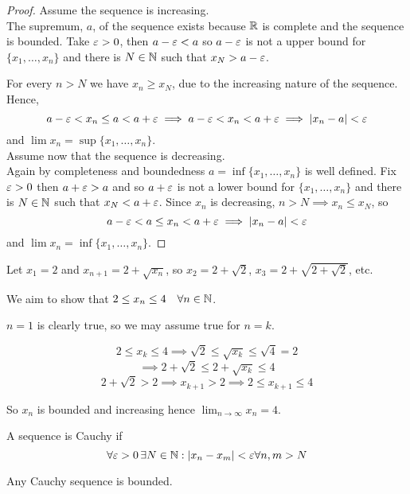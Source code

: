 \documentclass[a4paper,10pt]{article}
\begin{document}
\begin{proof}
	Assume the sequence is increasing.\\

	The supremum, $a$, of the sequence exists because $\mathbb{R}$ is
	complete and the sequence is bounded. Take $\varepsilon > 0$, then $a
	- \varepsilon < a$ so $a - \varepsilon$ is not a upper bound for $\{x_1,
	\ldots, x_n\}$ and there is $N \in \mathbb{N}$ such that $x_N > a - \varepsilon$.

	For every $n > N$ we have $x_n \geq x_N$, due to the increasing
	nature of the sequence. Hence,
	\[
		a - \varepsilon < x_n \leq a < a + \varepsilon
		\implies a - \varepsilon < x_n < a + \varepsilon
		\implies | x_n - a | < \varepsilon
	\]
	and $\lim x_n = \sup\{x_1, \ldots, x_n\}$.\\

	Assume now that the sequence is decreasing.\\

	Again by completeness and boundedness $a = \inf \{x_1, \ldots,
	x_n\}$ is well defined.
	Fix $\varepsilon > 0$ then $a + \varepsilon > a$ and so $a + \varepsilon$ is not a
	lower bound for $\{x_1, \ldots, x_n\}$ and there is $N \in \mathbb{N}$
	such that $x_N < a + \varepsilon$.
	Since $x_n$ is decreasing, $n > N \implies x_n \leq x_N$, so
	\[
		a - \varepsilon < a \leq x_n < a + \varepsilon
		\implies | x_n - a | < \varepsilon
	\]
	and $\lim x_n = \inf \{x_1, \ldots, x_n\}$.
\end{proof}

\begin{ex}
	Let $x_1 = 2$ and $x_{n+1} = 2 + \sqrt{x_n}$, so $x_2 = 2 +
	\sqrt{2}$, $x_3 = 2 + \sqrt{2 + \sqrt{2}}$, etc.

	We aim to show that $2 \leq x_n \leq 4 \quad \forall n \in \mathbb{N}$.

	$n=1$ is clearly true, so we may assume true for $n=k$.

	\[
		2 \leq x_k \leq 4 \implies \sqrt{2} \leq \sqrt{x_k} \leq \sqrt{4} = 2
	\]
	\[
		\implies 2 + \sqrt{2} \leq 2 + \sqrt{x_k} \leq 4
	\]
	\[
		2 + \sqrt{2} > 2 \implies x_{k+1} > 2 \implies 2 \leq x_{k+1} \leq 4
	\]

	So $x_n$ is bounded and increasing hence $\lim_{n \to \infty} x_n = 4$.
\end{ex}

\begin{defn}
	A sequence is Cauchy if
	\[
		\forall \varepsilon > 0 \, \exists N \in \mathbb{N} :
		| x_n - x_m | < \varepsilon \forall n,m > N
	\]
\end{defn}

\begin{thm}
	Any Cauchy sequence is bounded.
\end{thm}
\end{document}
